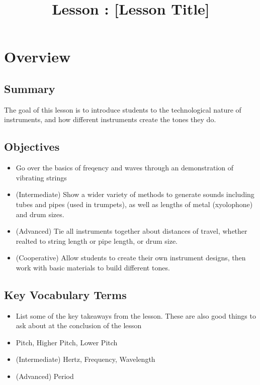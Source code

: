 \documentclass{lessonplan}
\title{Lesson \lessonNumber: [Lesson Title]}
\author{\linkHome}
\date{}
\begin{document}
  \maketitle

  \section{Overview}
    \subsection{Summary}
      The goal of this lesson is to introduce students to the technological nature of instruments,
       and how different instruments create the tones they do. 
    \subsection{Objectives}
    \begin{itemize}
      \item Go over the basics of freqency and waves through an demonstration of vibrating strings
      \item (Intermediate) Show a wider variety of methods to generate sounds 
      including tubes and pipes (used in trumpets), as well as lengths of metal 
      (xyolophone) and drum sizes.
      \item (Advanced) Tie all instruments together about distances of travel, 
      whether realted to string length or pipe length, or drum size.
      \item (Cooperative) Allow students to create their own instrument designs, 
      then work with basic materials to build different tones. 

    \end{itemize}
    \subsection{Key Vocabulary Terms}
    \begin{itemize}
      \item List some of the key takeaways from the lesson.  These are
        also good things to ask about at the conclusion of the lesson
      \item Pitch, Higher Pitch, Lower Pitch
      \item (Intermediate) Hertz, Frequency, Wavelength
      \item (Advanced) Period

    \end{itemize}
\end{document}

